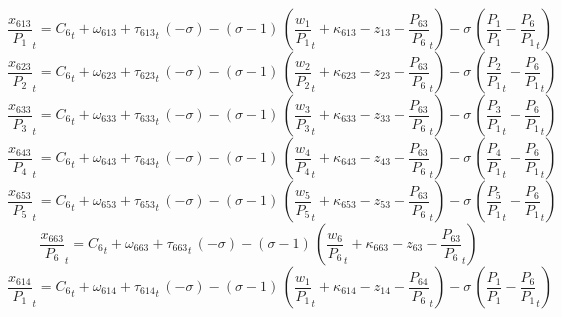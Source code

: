 \begin{dmath}
{{\frac{x_{613}}{P_{1}}}}_{t}={{C_{6}}}_{t}+{{\omega_{613}}}+{{\tau_{613}}}_{t}\, \left(-{{\sigma}}\right)-\left({{\sigma}}-1\right)\, \left({{\frac{w_{1}}{P_{1}}}}_{t}+{{\kappa_{613}}}-{{z_{13}}}-{{\frac{P_{63}}{P_{6}}}}_{t}\right)-{{\sigma}}\, \left({{\frac{P_{1}}{P_{1}}}}-{{\frac{P_{6}}{P_{1}}}}_{t}\right)
\end{dmath}
\begin{dmath}
{{\frac{x_{623}}{P_{2}}}}_{t}={{C_{6}}}_{t}+{{\omega_{623}}}+{{\tau_{623}}}_{t}\, \left(-{{\sigma}}\right)-\left({{\sigma}}-1\right)\, \left({{\frac{w_{2}}{P_{2}}}}_{t}+{{\kappa_{623}}}-{{z_{23}}}-{{\frac{P_{63}}{P_{6}}}}_{t}\right)-{{\sigma}}\, \left({{\frac{P_{2}}{P_{1}}}}_{t}-{{\frac{P_{6}}{P_{1}}}}_{t}\right)
\end{dmath}
\begin{dmath}
{{\frac{x_{633}}{P_{3}}}}_{t}={{C_{6}}}_{t}+{{\omega_{633}}}+{{\tau_{633}}}_{t}\, \left(-{{\sigma}}\right)-\left({{\sigma}}-1\right)\, \left({{\frac{w_{3}}{P_{3}}}}_{t}+{{\kappa_{633}}}-{{z_{33}}}-{{\frac{P_{63}}{P_{6}}}}_{t}\right)-{{\sigma}}\, \left({{\frac{P_{3}}{P_{1}}}}_{t}-{{\frac{P_{6}}{P_{1}}}}_{t}\right)
\end{dmath}
\begin{dmath}
{{\frac{x_{643}}{P_{4}}}}_{t}={{C_{6}}}_{t}+{{\omega_{643}}}+{{\tau_{643}}}_{t}\, \left(-{{\sigma}}\right)-\left({{\sigma}}-1\right)\, \left({{\frac{w_{4}}{P_{4}}}}_{t}+{{\kappa_{643}}}-{{z_{43}}}-{{\frac{P_{63}}{P_{6}}}}_{t}\right)-{{\sigma}}\, \left({{\frac{P_{4}}{P_{1}}}}_{t}-{{\frac{P_{6}}{P_{1}}}}_{t}\right)
\end{dmath}
\begin{dmath}
{{\frac{x_{653}}{P_{5}}}}_{t}={{C_{6}}}_{t}+{{\omega_{653}}}+{{\tau_{653}}}_{t}\, \left(-{{\sigma}}\right)-\left({{\sigma}}-1\right)\, \left({{\frac{w_{5}}{P_{5}}}}_{t}+{{\kappa_{653}}}-{{z_{53}}}-{{\frac{P_{63}}{P_{6}}}}_{t}\right)-{{\sigma}}\, \left({{\frac{P_{5}}{P_{1}}}}_{t}-{{\frac{P_{6}}{P_{1}}}}_{t}\right)
\end{dmath}
\begin{dmath}
{{\frac{x_{663}}{P_{6}}}}_{t}={{C_{6}}}_{t}+{{\omega_{663}}}+{{\tau_{663}}}_{t}\, \left(-{{\sigma}}\right)-\left({{\sigma}}-1\right)\, \left({{\frac{w_{6}}{P_{6}}}}_{t}+{{\kappa_{663}}}-{{z_{63}}}-{{\frac{P_{63}}{P_{6}}}}_{t}\right)
\end{dmath}
\begin{dmath}
{{\frac{x_{614}}{P_{1}}}}_{t}={{C_{6}}}_{t}+{{\omega_{614}}}+{{\tau_{614}}}_{t}\, \left(-{{\sigma}}\right)-\left({{\sigma}}-1\right)\, \left({{\frac{w_{1}}{P_{1}}}}_{t}+{{\kappa_{614}}}-{{z_{14}}}-{{\frac{P_{64}}{P_{6}}}}_{t}\right)-{{\sigma}}\, \left({{\frac{P_{1}}{P_{1}}}}-{{\frac{P_{6}}{P_{1}}}}_{t}\right)
\end{dmath}
